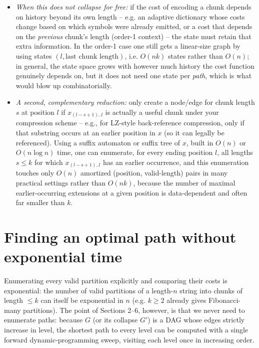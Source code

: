 \documentclass[11pt]{article}
\begin{document}
\begin{itemize}
  \item \emph{When this does not collapse for free:} if the cost of encoding a chunk
  depends on history beyond its own length -- e.g. an adaptive dictionary whose costs
  change based on which symbols were already emitted, or a cost that depends on the
  \emph{previous} chunk's length (order-1 context) -- the state must retain that extra
  information. In the order-1 case one still gets a linear-size graph by using states
  $(l, \text{last chunk length})$, i.e. $O(nk)$ states rather than $O(n)$; in general,
  the state space grows with however much history the cost function genuinely depends
  on, but it does not need one state per \emph{path}, which is what would blow up
  combinatorially.
  \item \emph{A second, complementary reduction:} only create a node/edge for chunk
  length $s$ at position $l$ if $x_{(l-s+1)..l}$ is actually a useful chunk under your
  compression scheme -- e.g., for LZ-style back-reference compression, only if that
  substring occurs at an earlier position in $x$ (so it can legally be referenced).
  Using a suffix automaton or suffix tree of $x$, built in $O(n)$ or $O(n \log n)$ time,
  one can enumerate, for every ending position $l$, all lengths $s \le k$ for which
  $x_{(l-s+1)..l}$ has an earlier occurrence, and this enumeration touches only
  $O(n)$ amortized (position, valid-length) pairs in many practical settings rather
  than $O(nk)$, because the number of maximal earlier-occurring extensions at a given
  position is data-dependent and often far smaller than $k$.
\end{itemize}

\section{Finding an optimal path without exponential time}
\label{sec:shortest-path}

Enumerating every valid partition explicitly and comparing their costs is exponential:
the number of valid partitions of a length-$n$ string into chunks of length $\le k$ can
itself be exponential in $n$ (e.g. $k \ge 2$ already gives Fibonacci-many partitions).
The point of Sections 2--6, however, is that we never need to enumerate paths: because
$G$ (or its collapse $G'$) is a DAG whose edges strictly increase in level, the
shortest path to every level can be computed with a single forward dynamic-programming
sweep, visiting each level once in increasing order.
\end{document}
